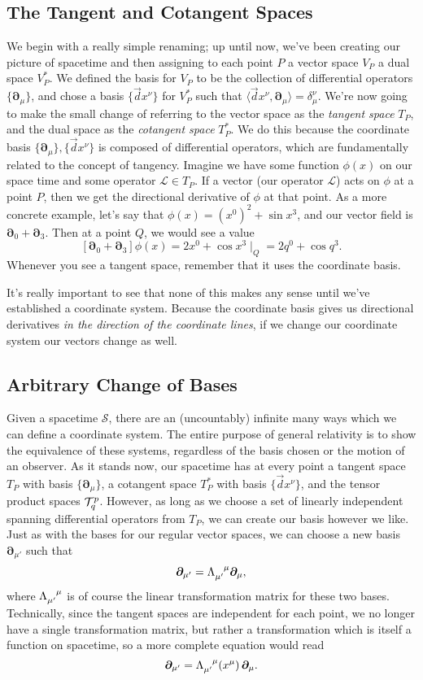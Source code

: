 \subsection{The Tangent and Cotangent Spaces}
We begin with a really simple renaming; up until now, we've been creating our picture of spacetime and then assigning to each point $P$ a vector space $V_P$ a dual space $V^*_P$.
We defined the basis for $V_P$ to be the collection of differential operators $\{\bm{\partial}_\mu\}$, and chose a basis $\{\vec{d}x^\nu\}$ for $V^*_P$ such that $\langle \vec{d}x^\nu, \bm{\partial}_\mu \rangle = \delta^\nu_\mu$.
We're now going to make the small change of referring to the vector space as the \emph{tangent space} $T_P$, and the dual space as the \emph{cotangent space} $T^*_P$.
We do this because the coordinate basis $\{\bm{\partial}_\mu\},\{\vec{d}x^\nu\}$ is composed of differential operators, which are fundamentally related to the concept of tangency.
Imagine we have some function $\phi(x)$ on our space time and some operator $\mathcal{L} \in T_P$.
If a vector (our operator $\mathcal{L}$) acts on $\phi$ at a point $P$, then we get the directional derivative of $\phi$ at that point.
As a more concrete example, let's say that $\phi(x) = (x^0)^2 + \sin x^3$, and our vector field is $\bm{\partial}_0 + \bm{\partial}_3$. Then at a point $Q$, we would see a value
\[ [\bm{\partial}_0 + \bm{\partial}_3]\phi(x) = {2x^0 + \cos x^3\mid_Q} = 2q^0 + \cos q^3. \]
Whenever you see a tangent space, remember that it uses the coordinate basis.

It's really important to see that none of this makes any sense until we've established a coordinate system.
Because the coordinate basis gives us directional derivatives \emph{in the direction of the coordinate lines}, if we change our coordinate system our vectors change as well.

\subsection{Arbitrary Change of Bases}
Given a spacetime $\mathcal{S}$, there are an (uncountably) infinite many ways which we can define a coordinate system.
The entire purpose of general relativity is to show the equivalence of these systems, regardless of the basis chosen or the motion of an observer.
As it stands now, our spacetime has at every point a tangent space $T_P$ with basis $\{\bm{\partial}_\mu\}$, a cotangent space $T^*_P$ with basis $\{\vec{d}x^\nu\}$, and the tensor product spaces $\mathcal{T}^p_q$.
However, as long as we choose a set of linearly independent spanning differential operators from $T_P$, we can create our basis however we like.
Just as with the bases for our regular vector spaces, we can choose a new basis $\bm{\partial}_{\mu'}$ such that
\[ \bm{\partial}_{\mu'} = \tensor{\Lambda}{_{\mu'}^\mu}\bm{\partial}_\mu, \]
where $\tensor{\Lambda}{_{\mu'}^\mu}$ is of course the linear transformation matrix for these two bases.
Technically, since the tangent spaces are independent for each point, we no longer have a single transformation matrix, but rather a transformation which is itself a function on spacetime, so a more complete equation would read
\[ \bm{\partial}_{\mu'} = \tensor{\Lambda}{_{\mu'}^\mu} (x^\mu)\,\bm{\partial}_\mu. \]

